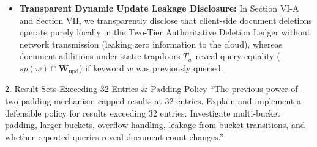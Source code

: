 \documentclass[11pt,a4paper]{article}
\begin{document}
\begin{responsebox}
\begin{itemize}[itemsep=2pt]
\begin{itemize}[itemsep=1pt]
        \item $\text{Game}_3 \to \text{Game}_4$: Simulates index lookups via simulator $\mathcal{S}$ parameterized solely by $\mathcal{L}_{\text{VH}}$ ($|\Pr[\text{Game}_3] - \Pr[\text{Game}_4]| \le \mathbf{Adv}_{\text{AES-GCM}}^{\text{int-ctxt}}$).
    \end{itemize}
    This mathematically demonstrates that static VisioCrypt leaks nothing beyond $\mathcal{L}_{\text{VH}}$.
    \item \textbf{Transparent Dynamic Update Leakage Disclosure:} In Section VI-A and Section VII, we transparently disclose that client-side document deletions operate purely locally in the Two-Tier Authoritative Deletion Ledger without network transmission (leaking zero information to the cloud), whereas document additions under static trapdoors $T_w$ reveal query equality ($sp(w) \cap \mathbf{W}_{\text{upd}}$) if keyword $w$ was previously queried.
\end{itemize}
\end{responsebox}

\vspace{1em}

\begin{reviewbox}{2. Result Sets Exceeding 32 Entries \& Padding Policy}
``The previous power-of-two padding mechanism capped results at 32 entries. Explain and implement a defensible policy for results exceeding 32 entries. Investigate multi-bucket padding, larger buckets, overflow handling, leakage from bucket transitions, and whether repeated queries reveal document-count changes.''
\end{reviewbox}
\end{document}
